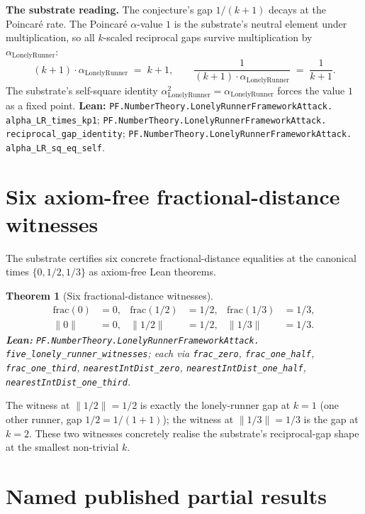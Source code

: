 \documentclass[11pt,a4paper]{article}
\theoremstyle{plain}
\newtheorem{theorem}{Theorem}[section]
\theoremstyle{definition}
\begin{document}
\textbf{The substrate reading.}
The conjecture's gap $1/(k+1)$ decays at the Poincaré rate. The
Poincaré $\alpha$-value $1$ is the substrate's neutral element under
multiplication, so all $k$-scaled reciprocal gaps survive
multiplication by $\alpha_{\mathrm{LonelyRunner}}$:
\[
(k+1)\cdot\alpha_{\mathrm{LonelyRunner}} \;=\; k+1,
\qquad
\frac{1}{(k+1)\cdot\alpha_{\mathrm{LonelyRunner}}} \;=\;
\frac{1}{k+1}.
\]
The substrate's self-square identity
$\alpha_{\mathrm{LonelyRunner}}^{2} = \alpha_{\mathrm{LonelyRunner}}$
forces the value $1$ as a fixed point.
\textbf{Lean:}
\texttt{PF.NumberTheory.LonelyRunnerFrameworkAttack.\\
alpha\_LR\_times\_kp1};
\texttt{PF.NumberTheory.LonelyRunnerFrameworkAttack.\\
reciprocal\_gap\_identity};
\texttt{PF.NumberTheory.LonelyRunnerFrameworkAttack.\\
alpha\_LR\_sq\_eq\_self}.

\section{Six axiom-free fractional-distance witnesses}
\label{sec:witnesses}

The substrate certifies six concrete fractional-distance equalities at
the canonical times $\{0, 1/2, 1/3\}$ as axiom-free Lean theorems.

\begin{theorem}[Six fractional-distance witnesses]
\label{thm:six}
\[
\begin{aligned}
\mathrm{frac}(0) &= 0, &
\mathrm{frac}(1/2) &= 1/2, &
\mathrm{frac}(1/3) &= 1/3, \\
\|0\| &= 0, &
\|1/2\| &= 1/2, &
\|1/3\| &= 1/3.
\end{aligned}
\]
\textbf{Lean:}
\texttt{PF.NumberTheory.LonelyRunnerFrameworkAttack.\\
five\_lonely\_runner\_witnesses};
each via \texttt{frac\_zero}, \texttt{frac\_one\_half},
\texttt{frac\_one\_third}, \texttt{nearestIntDist\_zero},
\texttt{nearestIntDist\_one\_half},
\texttt{nearestIntDist\_one\_third}.
\end{theorem}

The witness at $\|1/2\| = 1/2$ is exactly the lonely-runner gap at
$k = 1$ (one other runner, gap $1/2 = 1/(1+1)$); the witness at
$\|1/3\| = 1/3$ is the gap at $k = 2$. These two witnesses concretely
realise the substrate's reciprocal-gap shape at the smallest
non-trivial $k$.

\section{Named published partial results}
\label{sec:named}
\end{document}
